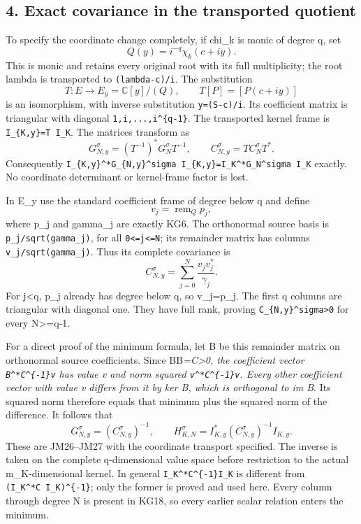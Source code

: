 \documentclass[11pt]{article}
\begin{document}
\subsection{4. Exact covariance in the transported quotient}\label{mrkg:exact-covariance-in-the-transported-quotient}

To specify the coordinate change completely, if chi\_k is monic of degree q, set \[
Q(y)=i^{-q}\chi_k(c+iy).
\] This is monic and retains every original root with its full multiplicity; the root lambda is transported to \texttt{(lambda-c)/i}. The substitution \[
T:E\longrightarrow E_y=\mathbb C[y]/(Q),\qquad
T[P]=[P(c+iy)]
\tag{KG17}
\] is an isomorphism, with inverse substitution \texttt{y=(S-c)/i}. Its coefficient matrix is triangular with diagonal \texttt{1,i,...,i\^{}\{q-1\}}. The transported kernel frame is \texttt{I\_\{K,y\}=T\ I\_K}. The matrices transform as \[
G_{N,y}^\sigma=(T^{-1})^*G_N^\sigma T^{-1},\qquad
C_{N,y}^\sigma=T C_N^\sigma T^*.
\] Consequently \texttt{I\_\{K,y\}\^{}*G\_\{N,y\}\^{}sigma\ I\_\{K,y\}=I\_K\^{}*G\_N\^{}sigma\ I\_K} exactly. No coordinate determinant or kernel-frame factor is lost.

In E\_y use the standard coefficient frame of degree below q and define \[
v_j=\operatorname{rem}_Qp_j,
\] where p\_j and gamma\_j are exactly KG6. The orthonormal source basis is \texttt{p\_j/sqrt(gamma\_j)}, for all \texttt{0\textless{}=j\textless{}=N}; its remainder matrix has columns \texttt{v\_j/sqrt(gamma\_j)}. Thus its complete covariance is \[
C_{N,y}^\sigma=\sum_{j=0}^N\frac{v_jv_j^*}{\gamma_j}.
\tag{KG18}
\] For j\textless q, p\_j already has degree below q, so v\_j=p\_j. The first q columns are triangular with diagonal one. They have full rank, proving \texttt{C\_\{N,y\}\^{}sigma\textgreater{}0} for every N\textgreater=q-1.

For a direct proof of the minimum formula, let B be this remainder matrix on orthonormal source coefficients. Since BB\emph{=C\textgreater0, the coefficient vector \texttt{B\^{}*C\^{}\{-1\}v} has value v and norm squared \texttt{v\^{}*C\^{}\{-1\}v}. Every other coefficient vector with value v differs from it by ker B, which is orthogonal to im B}. Its squared norm therefore equals that minimum plus the squared norm of the difference. It follows that \[
G_{N,y}^\sigma=(C_{N,y}^\sigma)^{-1},\qquad
\boxed{H_{K,N}^\sigma=I_{K,y}^*(C_{N,y}^\sigma)^{-1}I_{K,y}.}
\tag{KG19}
\] These are JM26--JM27 with the coordinate transport specified. The inverse is taken on the complete q-dimensional value space before restriction to the actual m\_K-dimensional kernel. In general \texttt{I\_K\^{}*C\^{}\{-1\}I\_K} is different from \texttt{(I\_K\^{}*C\ I\_K)\^{}\{-1\}}; only the former is proved and used here. Every column through degree N is present in KG18, so every earlier scalar relation enters the minimum.
\end{document}
